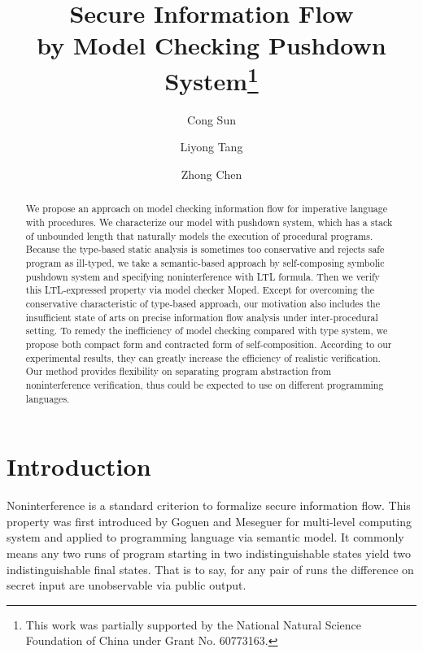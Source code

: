 \documentclass{llncs}
\begin{document}
\title{Secure Information Flow\\ by Model Checking Pushdown System\protect\footnote{This work was partially supported by the National
Natural Science Foundation of China under Grant No. 60773163.}}

\author{Cong Sun \and Liyong Tang \and Zhong Chen
} \maketitle


\begin{abstract}
We propose an approach on model checking information flow for
imperative language with procedures. We characterize our model with
pushdown system, which has a stack of unbounded length that
naturally models the execution of procedural programs. Because the
type-based static analysis is sometimes too conservative and rejects
safe program as ill-typed, we take a semantic-based approach by
self-composing symbolic pushdown system and specifying
noninterference with LTL formula. Then we verify this LTL-expressed
property via model checker Moped. Except for overcoming the
conservative characteristic of type-based approach, our motivation
also includes the insufficient state of arts on precise information
flow analysis under inter-procedural setting. To remedy the
inefficiency of model checking compared with type system, we propose
both compact form and contracted form of self-composition. According
to our experimental results, they can greatly increase the
efficiency of realistic verification. Our method provides
flexibility on separating program abstraction from noninterference
verification, thus could be expected to use on different programming
languages.
\end{abstract}
\section{\label{sec:intro}Introduction}

Noninterference is a standard criterion to formalize secure
information flow. This property was first introduced by Goguen and
Meseguer\cite{DBLP:conf/sp/GoguenM82} for multi-level computing
system and applied to programming language via semantic model. It
commonly means any two runs of program starting in two
indistinguishable states yield two indistinguishable final states.
That is to say, for any pair of runs the difference on secret input
are unobservable via public output.
\end{document}
